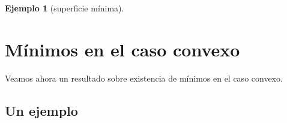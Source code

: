 \documentclass[12pt]{book}
\newtheorem{ex}{Ejemplo}
\theoremstyle{definition}
\theoremstyle{plain}
\theoremstyle{remark}
\begin{document}
\begin{ex}[superficie mínima]
%
%
%
%
%
%
%
%
%
%
%
% 
\end{ex}

\section{Mínimos en el caso convexo}

Veamos ahora un resultado sobre existencia de mínimos en el caso convexo.

\subsection{Un ejemplo} %
\end{document}
